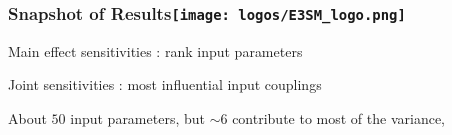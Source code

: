 %

\begin{frame}[t]
\label{e3sm}
\frametitle{Snapshot of Results\hfill \texttt{[image: logos/E3SM\_logo.png]}}
\vspace*{-.4cm}


\bi
\item Main effect sensitivities  : rank input parameters
\item Joint sensitivities : most influential input couplings
\item About $50$ input parameters, but $\sim 6$ contribute to most of the variance,
\ei

\begin{center}


\end{center}




\end{frame}


